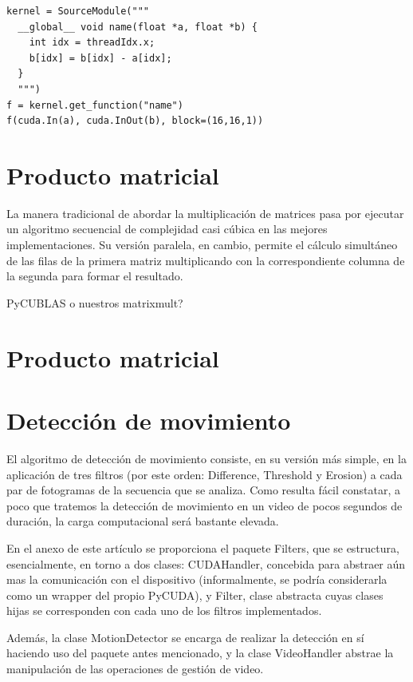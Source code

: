 \documentclass[twocolumn,twoside]{Jornadas}
\begin{document}
\begin{verbatim}
kernel = SourceModule("""
  __global__ void name(float *a, float *b) {
    int idx = threadIdx.x;
    b[idx] = b[idx] - a[idx];
  }
  """)
f = kernel.get_function("name")
f(cuda.In(a), cuda.InOut(b), block=(16,16,1))
\end{verbatim}

\section{Producto matricial}

La manera tradicional de abordar la multiplicación de matrices pasa por ejecutar un algoritmo secuencial de complejidad casi cúbica en las mejores implementaciones. Su versión paralela, en cambio, permite el cálculo simultáneo de las filas de la primera matriz multiplicando con la correspondiente columna de la segunda para formar el resultado.

PyCUBLAS o nuestros matrixmult?

\section{Producto matricial}

\section{Detección de movimiento}

El algoritmo de detección de movimiento consiste, en su versión más simple, en la aplicación de tres filtros (por este orden: Difference, Threshold y Erosion) a cada par de fotogramas de la secuencia que se analiza. Como resulta fácil constatar, a poco que tratemos la detección de movimiento en un video de pocos segundos de duración, la carga computacional será bastante elevada.

En el anexo de este artículo se proporciona el paquete Filters, que se estructura, esencialmente, en torno a dos clases: CUDAHandler, concebida para abstraer aún mas la comunicación con el dispositivo (informalmente, se podría considerarla como un wrapper del propio PyCUDA), y Filter, clase abstracta cuyas clases hijas se corresponden con cada uno de los filtros implementados.

Además, la clase MotionDetector se encarga de realizar la detección en sí haciendo uso del paquete antes mencionado, y la clase VideoHandler abstrae la manipulación de las operaciones de gestión de video.




\end{document}

